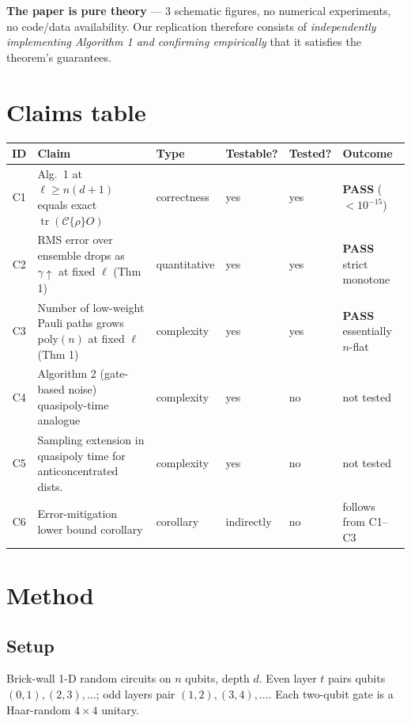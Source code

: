 \documentclass[11pt]{article}
\begin{document}
\textbf{The paper is pure theory} --- 3 schematic figures, no numerical experiments, no
code/data availability.  Our replication therefore consists of \emph{independently
implementing Algorithm 1 and confirming empirically} that it satisfies the theorem's
guarantees.

\section{Claims table}
\label{sec:claims}

\begin{tabular}{@{}clllll@{}}
\toprule
ID & Claim & Type & Testable? & Tested? & Outcome \\
\midrule
C1 & Alg.~1 at $\ell{\ge}n(d{+}1)$ equals exact $\operatorname{tr}(\mathcal C\{\rho\}O)$ & correctness & yes & yes & \textbf{PASS} ($<10^{-15}$) \\
C2 & RMS error over ensemble drops as $\gamma\uparrow$ at fixed $\ell$ (Thm 1)           & quantitative & yes & yes & \textbf{PASS} strict monotone \\
C3 & Number of low-weight Pauli paths grows poly$(n)$ at fixed $\ell$ (Thm 1)            & complexity   & yes & yes & \textbf{PASS} essentially $n$-flat \\
C4 & Algorithm 2 (gate-based noise) quasipoly-time analogue                                & complexity   & yes & no  & not tested \\
C5 & Sampling extension in quasipoly time for anticoncentrated dists.                      & complexity   & yes & no  & not tested \\
C6 & Error-mitigation lower bound corollary                                                 & corollary    & indirectly & no & follows from C1--C3 \\
\bottomrule
\end{tabular}

\section{Method}
\label{sec:method}

\subsection{Setup}
Brick-wall 1-D random circuits on $n$ qubits, depth $d$.  Even layer $t$ pairs qubits
$(0,1),(2,3),\ldots$; odd layers pair $(1,2),(3,4),\ldots$.  Each two-qubit gate is a
Haar-random $4{\times}4$ unitary.
\end{document}
